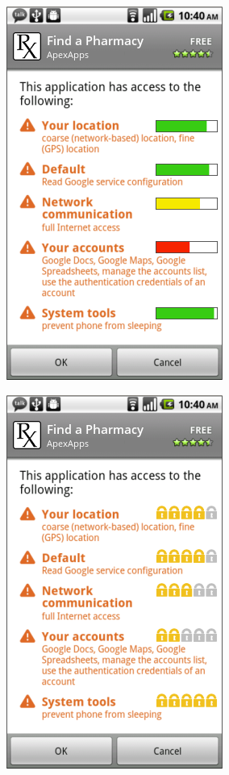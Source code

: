 \documentclass[11pt]{article}
\begin{document}
\begin{figure}
\centering
\begin{subfigure}{.5\textwidth}
  \centering
  \includegraphics[width=.65\linewidth]{img/PercPerms.png}
  \label{perc-perms}
\end{subfigure}%
\begin{subfigure}{.5\textwidth}
  \centering
  \includegraphics[width=.65\linewidth]{img/LockPerms.png}

\end{subfigure}
\end{figure}
\end{document}
